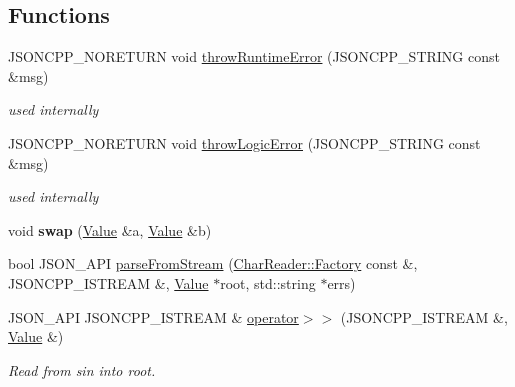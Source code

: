 \subsection*{Functions}
\begin{DoxyCompactItemize}
\item 
\mbox{\label{namespaceJson_a0ab7ff7f99788262d92d9ff3d924e065}} 
J\+S\+O\+N\+C\+P\+P\+\_\+\+N\+O\+R\+E\+T\+U\+RN void \hyperlink{namespaceJson_a0ab7ff7f99788262d92d9ff3d924e065}{throw\+Runtime\+Error} (J\+S\+O\+N\+C\+P\+P\+\_\+\+S\+T\+R\+I\+NG const \&msg)
\begin{DoxyCompactList}\small\item\em used internally \end{DoxyCompactList}\item 
\mbox{\label{namespaceJson_a27790f21f17922fac81e7cd72a5659a5}} 
J\+S\+O\+N\+C\+P\+P\+\_\+\+N\+O\+R\+E\+T\+U\+RN void \hyperlink{namespaceJson_a27790f21f17922fac81e7cd72a5659a5}{throw\+Logic\+Error} (J\+S\+O\+N\+C\+P\+P\+\_\+\+S\+T\+R\+I\+NG const \&msg)
\begin{DoxyCompactList}\small\item\em used internally \end{DoxyCompactList}\item 
\mbox{\label{namespaceJson_afed1c011474d8243d72fc38f43de0f8e}} 
void {\bfseries swap} (\hyperlink{classJson_1_1Value}{Value} \&a, \hyperlink{classJson_1_1Value}{Value} \&b)
\item 
bool J\+S\+O\+N\+\_\+\+A\+PI \hyperlink{namespaceJson_aab0cf1ecf81d1aeca12be2a416a84352}{parse\+From\+Stream} (\hyperlink{classJson_1_1CharReader_1_1Factory}{Char\+Reader\+::\+Factory} const \&, J\+S\+O\+N\+C\+P\+P\+\_\+\+I\+S\+T\+R\+E\+AM \&, \hyperlink{classJson_1_1Value}{Value} $\ast$root, std\+::string $\ast$errs)
\item 
J\+S\+O\+N\+\_\+\+A\+PI J\+S\+O\+N\+C\+P\+P\+\_\+\+I\+S\+T\+R\+E\+AM \& \hyperlink{namespaceJson_a244ed0996aba750c40c1641c06bba449}{operator$>$$>$} (J\+S\+O\+N\+C\+P\+P\+\_\+\+I\+S\+T\+R\+E\+AM \&, \hyperlink{classJson_1_1Value}{Value} \&)
\begin{DoxyCompactList}\small\item\em Read from \textquotesingle{}sin\textquotesingle{} into \textquotesingle{}root\textquotesingle{}. \end{DoxyCompactList}\item 

\end{DoxyCompactItemize}
